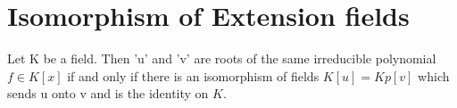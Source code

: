   \section{Isomorphism of Extension fields}
  Let K be a field. Then 'u' and 'v' are  roots of the same irreducible polynomial \(f \in K[x]\) if and only if there is an isomorphism of fields \(K[u]=Kp[v]\) which sends u onto v and is the identity on \(K\).\\






